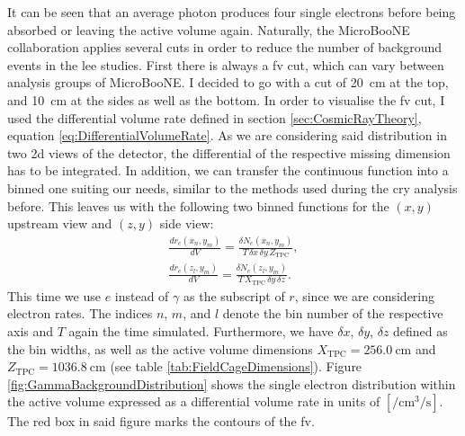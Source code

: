 It can be seen that an average photon produces four single electrons before being absorbed or leaving the active volume again. Naturally, the MicroBooNE  collaboration applies several cuts in order to reduce the number of background events in the \gls{lee} studies. First there is always a \gls{fv} cut, which can vary between analysis groups of MicroBooNE. I decided to go with a cut of \SI{20}{\centi\metre} at the top, and \SI{10}{\centi\metre} at the sides as well as the bottom. In order to visualise the \gls{fv} cut, I used the differential volume rate defined in section \ref{sec:CosmicRayTheory}, equation \ref{eq:DifferentialVolumeRate}. As we are considering said distribution in two \gls{2d} views of the detector, the differential of the respective missing dimension has to be integrated. In addition, we can transfer the continuous function into a binned one suiting our needs, similar to the methods used during the \gls{cry} analysis before. This leaves us with the following two binned functions for the $(x,y)$ upstream view and $(z,y)$ side view:
\begin{align} \label{eq:BinnedDifferentialVolumeRateXY}
    \frac{dr_e(x_n,y_m)}{dV} = \frac{\delta N_e(x_n,y_m)}{T \, \delta x \, \delta y \, Z_{\text{TPC}}}, \\[5pt]
    \frac{dr_e(z_l,y_m)}{dV} = \frac{\delta N_e(z_l,y_m)}{T \, X_{\text{TPC}} \, \delta y \, \delta z}.
    \label{eq:BinnedDifferentialVolumeRateZY}
\end{align}
This time we use $e$ instead of $\gamma$ as the subscript of $r$, since we are considering electron rates. The indices $n$, $m$, and $l$ denote the bin number of the respective axis and $T$ again the time simulated. Furthermore, we have $\delta x$, $\delta y$, $\delta z$ defined as the bin widths, as well as the active volume dimensions $X_{\text{TPC}} = \SI{256.0}{\centi\metre}$ and $Z_{\text{TPC}} = \SI{1036.8}{\centi\metre}$ (see table \ref{tab:FieldCageDimensions}). Figure \ref{fig:GammaBackgroundDistribution} shows the single electron distribution within the active volume expressed as a differential volume rate in units of $[\si{\per\centi\metre\cubed\per\second}]$. The red box in said figure marks the contours of the \gls{fv}.   

